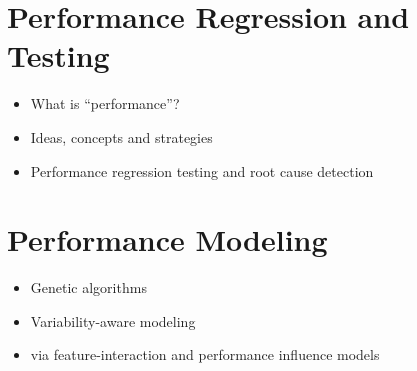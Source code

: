 \section{Performance Regression and Testing} \label{sec:2.2}
\begin{itemize}
  \item What is ``performance''? \citep{molyneaux_art_2014} 
  \item Ideas, concepts and strategies
  \citep{molyneaux_art_2014,fleming_how_1986,woodside_future_2007}
  \item Performance regression testing
  \citep{nguyen_industrial_2014,foo_mining_2010} and root cause detection
  \citep{heger_automated_2013}
\end{itemize}

\section{Performance Modeling} \label{sec:2.4}
\begin{itemize}
  \item Genetic algorithms \citep{guo_genetic_2011}
  \item Variability-aware modeling \citep{guo_variability-aware_2013}
  \item via feature-interaction and performance influence models
  \citep{siegmund_predicting_2012,siegmund_performance-influence_2015}
\end{itemize}